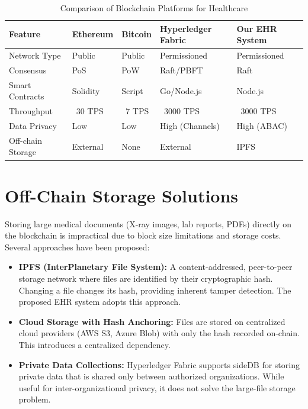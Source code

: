 \begin{table}[h]
\centering
\caption{Comparison of Blockchain Platforms for Healthcare}
\label{tab:blockchain_comparison}
\begin{tabular}{|p{3.0cm}|p{2.5cm}|p{2.5cm}|p{2.5cm}|p{2.5cm}|}
\hline
\textbf{Feature} & \textbf{Ethereum} & \textbf{Bitcoin} & \textbf{Hyperledger Fabric} & \textbf{Our EHR System} \\
\hline
Network Type & Public & Public & Permissioned & Permissioned \\
\hline
Consensus & PoS & PoW & Raft/PBFT & Raft \\
\hline
Smart Contracts & Solidity & Script & Go/Node.js & Node.js \\
\hline
Throughput & ~30 TPS & ~7 TPS & ~3000 TPS & ~3000 TPS \\
\hline
Data Privacy & Low & Low & High (Channels) & High (ABAC) \\
\hline
Off-chain Storage & External & None & External & IPFS \\
\hline
\end{tabular}
\end{table}

\section{Off-Chain Storage Solutions}

Storing large medical documents (X-ray images, lab reports, PDFs) directly on the blockchain is impractical due to block size limitations and storage costs. Several approaches have been proposed:

\begin{itemize}
    \item \textbf{IPFS (InterPlanetary File System):} A content-addressed, peer-to-peer storage network where files are identified by their cryptographic hash. Changing a file changes its hash, providing inherent tamper detection. The proposed EHR system adopts this approach.
    \item \textbf{Cloud Storage with Hash Anchoring:} Files are stored on centralized cloud providers (AWS S3, Azure Blob) with only the hash recorded on-chain. This introduces a centralized dependency.
    \item \textbf{Private Data Collections:} Hyperledger Fabric supports sideDB for storing private data that is shared only between authorized organizations. While useful for inter-organizational privacy, it does not solve the large-file storage problem.
\end{itemize}

